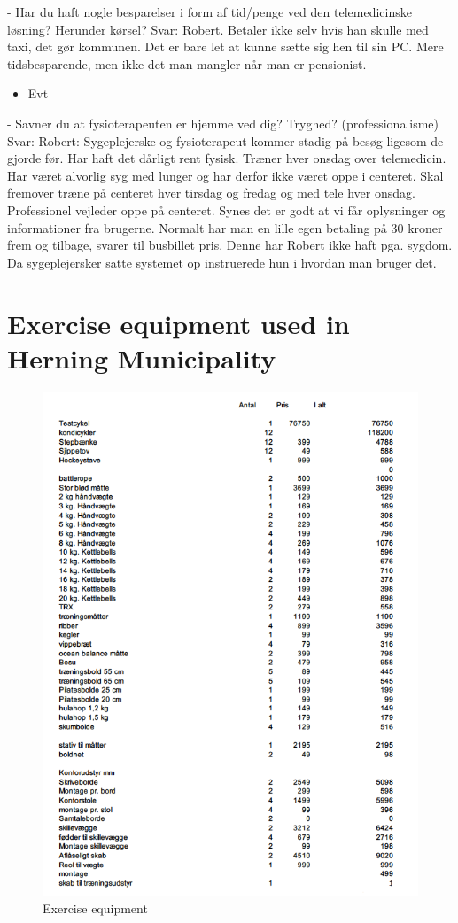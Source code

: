 -	Har du haft nogle besparelser i form af tid/penge ved den telemedicinske løsning?
Herunder kørsel?
Svar:
Robert. Betaler ikke selv hvis han skulle med taxi, det gør kommunen. Det er bare let at kunne sætte sig hen til sin PC. Mere tidsbesparende, men ikke det man mangler når man er pensionist.

\begin{itemize}
	\item Evt
\end{itemize}
-	Savner du at fysioterapeuten er hjemme ved dig? Tryghed? (professionalisme)
Svar:
Robert: Sygeplejerske og fysioterapeut kommer stadig på besøg ligesom de gjorde
før. Har haft det dårligt rent fysisk. Træner hver onsdag over telemedicin. Har været alvorlig syg med lunger og har derfor ikke været oppe i centeret. Skal fremover træne på centeret hver tirsdag og fredag og med tele hver onsdag. Professionel vejleder oppe på centeret. Synes det er godt at vi får oplysninger og informationer fra brugerne. Normalt har man en lille egen betaling på 30 kroner frem og tilbage, svarer til busbillet pris. Denne har Robert ikke haft pga. sygdom. Da sygeplejersker satte systemet op instruerede hun i hvordan man bruger det.


\chapter{Exercise equipment used in Herning Municipality} \label{cost}
\begin{figure}[H]
\centering
\includegraphics[width=1.0\textwidth]{Figure/8}
\caption{Exercise equipment}

\end{figure} 

 
